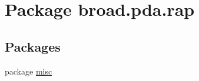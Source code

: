 \hypertarget{namespacebroad_1_1pda_1_1rap}{\section{Package broad.\+pda.\+rap}
\label{namespacebroad_1_1pda_1_1rap}
}
\subsection*{Packages}
\begin{DoxyCompactItemize}
\item 
package \hyperlink{namespacebroad_1_1pda_1_1rap_1_1misc}{misc}
\end{DoxyCompactItemize}
